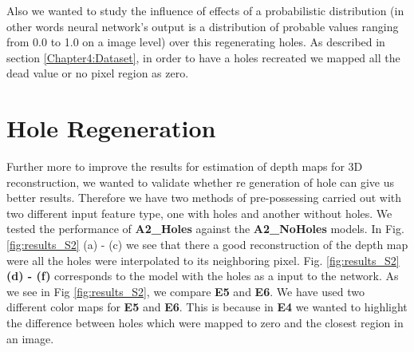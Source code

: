  Also we wanted to study the influence of effects of a probabilistic distribution (in other words neural network's output is a distribution of probable values ranging from 0.0 to 1.0 on a image level) over this regenerating holes. As described in section \ref{Chapter4:Dataset}, in order to have a holes recreated we mapped all the dead value or no pixel region as zero.

\newpage

 \section{Hole Regeneration}
 \label{Chapter6:Hole_Regeneration}


Further more to improve the results for estimation of depth maps for 3D reconstruction, we wanted to validate whether re generation of hole can give us better results. Therefore we have two methods of pre-possessing carried out with two different input feature type, one with holes and another without holes. We tested the performance of \textbf{A2\_Holes} against the \textbf{A2\_NoHoles} models. In Fig. \ref{fig:results_S2} (a) - (c) we see that there a good reconstruction of the depth map were all the holes were interpolated to its neighboring pixel.  Fig. \ref{fig:results_S2} \textbf{(d) - (f)}  corresponds to the model with the holes as a input to the network. As we see in Fig \ref{fig:results_S2}, we compare \textbf{E5} and \textbf{E6}. We have used two different color maps for \textbf{E5} and \textbf{E6}. This is because in \textbf{E4} we wanted to highlight the difference between holes which were mapped to zero and the closest region in an image. 


